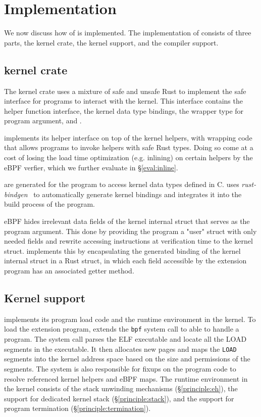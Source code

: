 \section{Implementation}
\label{sec:impl}
We now discuss how of \projname{} is implemented.
The implementation of \projname{} consists of three parts, the \projname{}
    kernel crate, the kernel support, and the compiler support.

\subsection{\projname{} kernel crate}
\label{impl:kernel-crate}
The kernel crate uses a mixture of safe and unsafe Rust to implement the safe
    interface for \projname{} programs to interact with the kernel.
This interface contains the helper function interface, the kernel data type
    bindings, the wrapper type for program argument, and .

\projname{} implements its helper interface on top of the kernel helpers, with
    wrapping code that allows programs to invoke helpers with safe Rust types.
Doing so come at a cost of losing the load time optimization (e.g. inlining) on
    certain helpers by the eBPF verfier, which we further evaluate in
    \S\ref{eval:inline}.

 are generated for the program to access kernel
    data types defined in C.
\projname{} uses \emph{rust-bindgen}~\cite{bindgen} to automatically generate
    kernel bindings and integrates it into the build process of the program.

eBPF hides irrelevant data fields of the kernel internal struct that serves as
    the program argument.
This done by providing the program a "user" struct with only needed fields and
    rewrite accessing instructions at verification time to the kernel struct.
\projname{} implements this by encapsulating the generated binding of the
    kernel internal struct in a Rust struct, in which each field accessible by
    the extension program has an associated getter method.

\subsection{Kernel support}
\label{impl:kernel}
\projname{} implements its program load code and the runtime environment in the
    kernel.
To load the extension program, \projname{} extends the \texttt{bpf} system
    call to able to handle a \projname{} program.
The system call parses the ELF executable and locate all the LOAD segments in
    the executable.
It then allocates new pages and maps the \texttt{LOAD} segments into the kernel
    address space based on the size and permissions of the segments.
The system is also responsible for fixups on the program code to resolve
    referenced kernel helpers and eBPF maps.
The \projname{} runtime environment in the kernel consists of the stack
    unwinding mechanisms (\S\ref{principle:eh}), the support for dedicated
    kernel stack (\S\ref{principle:stack}), and the support for program
    termination (\S\ref{principle:termination}).

